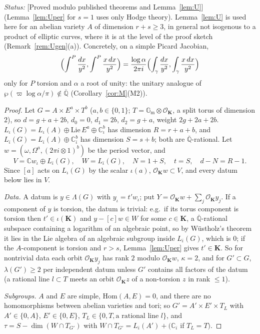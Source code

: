 \documentclass[11pt]{amsart}
\theoremstyle{definition}
\newcommand{\Qb}{\overline{\mathbb{Q}}}
\newcommand{\C}{\mathbb{C}}
\newcommand{\Gm}{\mathbb{G}_{\mathrm m}}
\newcommand{\vp}{\varpi}
\newcommand{\lab}[1]{\textup{[#1]}}
\newcommand{\LabC}{\lab{Proved modulo published theorems and Lemma~\ref{lem:U}}}
\newcommand{\Status}{\noindent\emph{Status:} }
\begin{document}
\Status \LabC{} (Lemma~\ref{lem:Uper} for $s=1$ uses only Hodge theory). Lemma~\ref{lem:U} is used here for an abelian
variety $A$ of dimension $r+s\ge3$, in general not isogenous to a product of elliptic curves, where it is at the level of
the proof sketch (Remark~\ref{rem:Ugen}(a)). Concretely, on a simple Picard Jacobian,
\[
\Bigl(\int^P\frac{dx}{y^2},\int^P\frac{x\,dx}{y^2}\Bigr)=\frac{\log\alpha}{2\pi i}\Bigl(\int_\gamma\frac{dx}{y^2},\int_\gamma\frac{x\,dx}{y^2}\Bigr)
\]
only for $P$ torsion and $\alpha$ a root of unity: the unitary analogue of $\wp(\vp\log\alpha/\pi)\notin\Qb$ (Corollary~\ref{cor:M}(M2)).

\begin{proof}
Let $G=A\times E^a\times T^b$ ($a,b\in\{0,1\}$; $T=\Gm\otimes\mathcal O_{\mathbf K}$, a split torus of dimension $2$), so
$d=g+a+2b$, $d_0=0$, $d_1=2b$, $d_2=g+a$, weight $2g+2a+2b$. $L_\iota(G)=L_\iota(A)\oplus\mathrm{Lie}\,E^a\oplus\C_\iota^b$ has
dimension $R=r+a+b$, and $L_{\bar\iota}(G)=L_{\bar\iota}(A)\oplus\C_{\bar\iota}^b$ has dimension $S=s+b$; both are $\Qb$-rational. Let
$w=(\omega,\Omega^a,(2\pi i\otimes1)^b)$ be the period vector, and
\[
V=\C w_\iota\oplus L_{\bar\iota}(G),\quad W=L_{\bar\iota}(G),\quad N=1+S,\quad t=S,\quad d-N=R-1 .
\]
Since $[a]$ acts on $L_\iota(G)$ by the scalar $\iota(a)$, $\mathcal O_{\mathbf K}w\subset V$, and every datum below lies in $V$.

\emph{Data.} A datum is $y\in\Lambda(G)$ with $y_\iota=t'w_\iota$; put $Y=\mathcal O_{\mathbf K}w+\sum_j\mathcal O_{\mathbf K}y_j$.
If a component of $y$ is torsion, the datum is trivial: e.g.\ if its torus component is torsion then $t'\in\iota(\mathbf K)$ and
$y-[c]w\in W$ for some $c\in\mathbf K$, a $\Qb$-rational subspace containing a logarithm of an algebraic point, so by
W\"ustholz's theorem it lies in the Lie algebra of an algebraic subgroup inside $L_{\bar\iota}(G)$, which is $0$; if the
$A$-component is torsion and $r>s$, Lemma~\ref{lem:Uper} gives $t'\in\mathbf K$. So for nontrivial data each orbit
$\mathcal O_{\mathbf K}y_j$ has rank $2$ modulo $\mathcal O_{\mathbf K}w$, $\kappa=2$, and for $G'\subset G$,
$\lambda(G')\ge2$ per independent datum unless $G'$ contains all factors of the datum (a rational line $l\subset T$ meets an
orbit $\mathcal O_{\mathbf K}z$ of a non-torsion $z$ in rank $\le1$).

\emph{Subgroups.} $A$ and $E$ are simple, $\mathrm{Hom}(A,E)=0$, and there are no homomorphisms between abelian varieties and
tori; so $G'=A'\times E'\times T_L$ with $A'\in\{0,A\}$, $E'\in\{0,E\}$, $T_L\in\{0,T,\text{a rational line }l\}$, and
$\tau=S-\dim(W\cap T_{G'})$ with $W\cap T_{G'}=L_{\bar\iota}(A')+(\C_{\bar\iota}$ if $T_L=T)$.


\end{proof}
\end{document}

